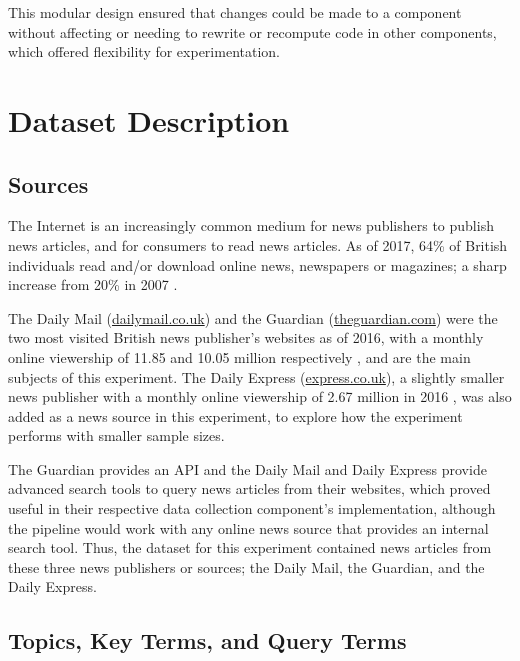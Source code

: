 \documentclass{report}
\begin{document}
This modular design ensured that changes could be made to a component without affecting or needing to rewrite or recompute code in other components, which offered flexibility for experimentation.

\section{Dataset Description} \label{Dataset Description}  %

\subsection{Sources} \label{sources}

The Internet is an increasingly common medium for news publishers to publish news articles, and for consumers to read news articles.
As of 2017, 64\% of British individuals read and/or download online news, newspapers or magazines; a sharp increase from 20\% in 2007 \cite{statista2018share}. 

The Daily Mail (\url{dailymail.co.uk}) and the Guardian (\url{theguardian.com}) were the two most visited British news publisher's websites as of 2016, with a monthly online viewership of 11.85 and 10.05 million respectively \cite{statista2018newspaper}, and are the main subjects of this experiment.
The Daily Express (\url{express.co.uk}), a slightly smaller news publisher with a monthly online viewership of 2.67 million in 2016 \cite{statista2018newspaper}, was also added as a news source in this experiment, to explore how the experiment performs with smaller sample sizes.

The Guardian provides an API \cite{guardian} and the Daily Mail and Daily Express provide advanced search tools \cite{daily-mail, daily-express} to query news articles from their websites, which proved useful in their respective data collection component's implementation, although the pipeline would work with any online news source that provides an internal search tool.
Thus, the dataset for this experiment contained news articles from these three news publishers or sources; the Daily Mail, the Guardian, and the Daily Express.

\subsection{Topics, Key Terms, and Query Terms} \label{topics}
\end{document}
